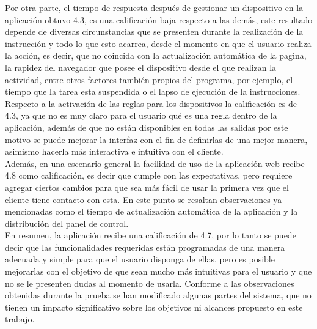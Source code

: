 Por otra parte, el tiempo de respuesta después de gestionar un dispositivo en la aplicación obtuvo 4.3, es una calificación baja respecto a las demás, este resultado depende de diversas circunstancias que se presenten durante la realización de la instrucción y todo lo que esto acarrea, desde el momento en que el usuario realiza la acción, es decir, que no coincida con la actualización automática de la pagina, la rapidez del navegador que posee el dispositivo desde el que realizan la actividad, entre otros factores también propios del programa, por ejemplo, el tiempo que la tarea esta suspendida o el lapso de ejecución de la instrucciones.\\

Respecto a la activación de las reglas para los dispositivos la calificación es de 4.3, ya que no es muy claro para el usuario qué es una regla dentro de la aplicación, además de que no están disponibles en todas las salidas por este motivo se puede mejorar la interfaz con el fin de definirlas de una mejor manera, asimismo hacerla más interactiva e intuitiva con el cliente.\\

Además, en una escenario general la facilidad de uso de la aplicación web recibe 4.8 como calificación, es decir que cumple con las expectativas, pero requiere agregar ciertos cambios para que sea más fácil de usar la primera vez que el cliente tiene contacto con esta. En este punto se resaltan observaciones ya mencionadas como el tiempo de actualización automática de la aplicación y la distribución del panel de control.\\ 

En resumen, la aplicación recibe una calificación de 4.7, por lo tanto se puede decir que las funcionalidades requeridas están programadas de una manera adecuada y simple para que el usuario disponga de ellas, pero es posible mejorarlas con el objetivo de que sean mucho más intuitivas para el usuario y que no se le presenten dudas al momento de usarla. Conforme a las observaciones obtenidas durante la prueba se han modificado algunas partes del sistema, que no tienen un impacto significativo sobre los objetivos ni alcances propuesto en este trabajo.\\

